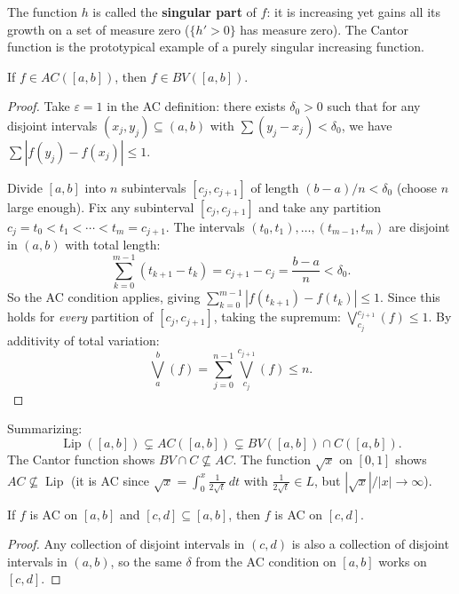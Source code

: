\documentclass[11pt]{report}
\begin{document}
\begin{rembox}
The function $h$ is called the \textbf{singular part} of $f$: it is increasing yet gains all its growth on a set of measure zero ($\{h' > 0\}$ has measure zero). The Cantor function is the prototypical example of a purely singular increasing function.
\end{rembox}

\begin{thmbox}[$AC \implies BV$]
If $f \in AC([a, b])$, then $f \in BV([a, b])$.
\end{thmbox}

\begin{proof}
Take $\varepsilon = 1$ in the AC definition: there exists $\delta_0 > 0$ such that for any disjoint intervals $(x_j, y_j) \subseteq (a, b)$ with $\sum (y_j - x_j) < \delta_0$, we have $\sum |f(y_j) - f(x_j)| \leq 1$.

Divide $[a, b]$ into $n$ subintervals $[c_j, c_{j+1}]$ of length $(b - a)/n < \delta_0$ (choose $n$ large enough). Fix any subinterval $[c_j, c_{j+1}]$ and take any partition $c_j = t_0 < t_1 < \cdots < t_m = c_{j+1}$. The intervals $(t_0, t_1), \ldots, (t_{m-1}, t_m)$ are disjoint in $(a, b)$ with total length:
\[
\sum_{k=0}^{m-1} (t_{k+1} - t_k) = c_{j+1} - c_j = \frac{b-a}{n} < \delta_0.
\]
So the AC condition applies, giving $\sum_{k=0}^{m-1} |f(t_{k+1}) - f(t_k)| \leq 1$. Since this holds for \textit{every} partition of $[c_j, c_{j+1}]$, taking the supremum: $\bigvee_{c_j}^{c_{j+1}}(f) \leq 1$. By additivity of total variation:
\[
\bigvee_a^b(f) = \sum_{j=0}^{n-1} \bigvee_{c_j}^{c_{j+1}}(f) \leq n.
\]
\end{proof}

\begin{rembox}
Summarizing:
\[
\operatorname{Lip}([a,b]) \subsetneq AC([a,b]) \subsetneq BV([a,b]) \cap C([a,b]).
\]
The Cantor function shows $BV \cap C \not\subseteq AC$. The function $\sqrt{x}$ on $[0, 1]$ shows $AC \not\subseteq \operatorname{Lip}$ (it is AC since $\sqrt{x} = \int_0^x \frac{1}{2\sqrt{t}}\,dt$ with $\frac{1}{2\sqrt{t}} \in L$, but $|\sqrt{x}|/|x| \to \infty$).
\end{rembox}

\begin{lembox}[AC on Subintervals]
If $f$ is AC on $[a, b]$ and $[c, d] \subseteq [a, b]$, then $f$ is AC on $[c, d]$.
\end{lembox}

\begin{proof}
Any collection of disjoint intervals in $(c, d)$ is also a collection of disjoint intervals in $(a, b)$, so the same $\delta$ from the AC condition on $[a, b]$ works on $[c, d]$.
\end{proof}
\end{document}
